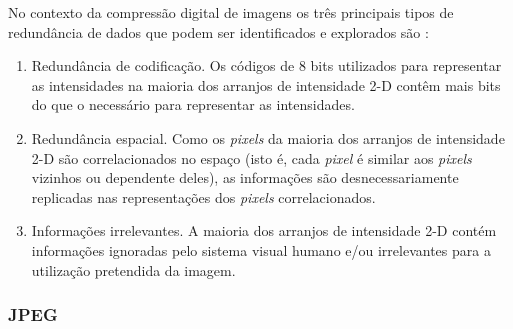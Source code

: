 No contexto da compressão digital de imagens os três principais tipos de redundância de dados que podem ser identificados e explorados são \cite{gonzalez2009processamento}:
\begin{enumerate}
	\item Redundância de codificação. Os códigos de 8 bits utilizados para representar as intensidades na maioria dos arranjos de intensidade	2-D contêm mais bits do que o necessário para representar as intensidades.
	\item Redundância espacial. Como os \textit{pixels} da
	maioria dos arranjos de intensidade 2-D são correlacionados no espaço (isto é, cada \textit{pixel} é similar aos \textit{pixels} vizinhos ou dependente deles), as informações são desnecessariamente replicadas nas representações dos \textit{pixels} correlacionados.
	\item Informações irrelevantes. A maioria dos arranjos de intensidade 2-D contém informações ignoradas pelo sistema visual humano e/ou irrelevantes para a utilização pretendida da imagem. 
\end{enumerate}


\subsubsection{JPEG}

